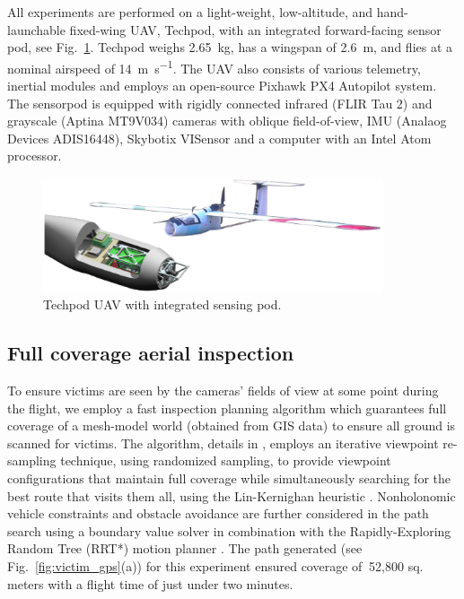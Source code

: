 \documentclass[runningheads]{llncs}
\begin{document}
All experiments are performed on a light-weight, low-altitude, and hand-launchable fixed-wing UAV, Techpod, with an integrated forward-facing sensor pod, see Fig.~\ref{fig:techpod}. Techpod weighs \SI{2.65}{\kilo\gram}, has a wingspan of \SI{2.6}{\meter}, and flies at a nominal airspeed of \SI{14}{\meter\per\second}. The UAV also consists of various telemetry, inertial modules and employs an open-source Pixhawk PX4 Autopilot \cite{meier2015px4} system. The sensorpod is equipped with rigidly connected infrared (FLIR Tau 2) and grayscale (Aptina MT9V034) cameras with oblique field-of-view, IMU (Analaog Devices ADIS16448), Skybotix VISensor \cite{Skybotix} and a computer with an Intel Atom processor.

\begin{figure}
\centerline{\includegraphics[width=10cm]{img/eps/techpod.eps}}
\caption{Techpod UAV with integrated sensing pod.}
\label{fig:techpod}
\end{figure}

\subsection{Full coverage aerial inspection}

To ensure victims are seen by the cameras' fields of view at some point during the flight, we employ a fast inspection planning algorithm which guarantees full coverage of a mesh-model world (obtained from GIS data) to ensure all ground is scanned for victims. The algorithm, details in \cite{7140101}, employs an iterative viewpoint re-sampling technique, using randomized sampling, to provide viewpoint configurations that maintain full coverage while simultaneously searching for the best route that visits them all, using the Lin-Kernighan heuristic \cite{lin1973effective}. Nonholonomic vehicle constraints and obstacle avoidance are further considered in the path search using a boundary value solver in combination with the Rapidly-Exploring Random Tree (RRT*) motion planner \cite{RRTS1a}. The path generated (see Fig.~\ref{fig:victim_gps}(a)) for this experiment ensured coverage of $~$52,800 sq. meters with a flight time of just under two minutes.
\end{document}
